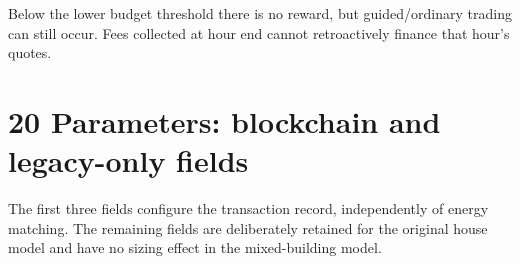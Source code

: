 \documentclass[a4paper,11pt]{article}
\begin{document}
Below the lower budget threshold there is no reward, but guided/ordinary trading can still occur. Fees collected at hour end cannot retroactively finance that hour's quotes.
\par\medskip

\clearpage

\section*{20  Parameters: blockchain and legacy-only fields}
\par\medskip

The first three fields configure the transaction record, independently of energy matching. The remaining fields are deliberately retained for the original house model and have no sizing effect in the mixed-building model.
\par\medskip
\end{document}
